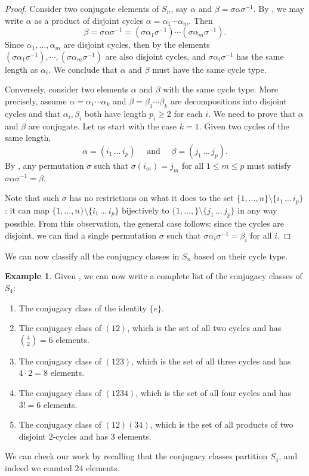 \documentclass[12pt]{report}
\numberwithin{equation}{section}
\numberwithin{theorem}{chapter}
\theoremstyle{definition}
\newtheorem{example}[theorem]{Example}
\newtheorem*{basic properties}{Basic Properties}
\newtheorem*{Important Remark}{Important Remark}
\newcommand{\s}{\sigma}
\begin{document}
\begin{proof}
Consider two conjugate elements of $S_n$, say $\alpha$ and $\beta = \s \alpha \s^{-1}$. By , we may write $\alpha$ as a product of disjoint cycles $\alpha = \alpha_1 \cdots \alpha_m$. Then 
$$\beta = \s \alpha \s^{-1} = (\s \alpha_1 \s^{-1})  \cdots (\s \alpha_m \s^{-1}).$$ 
Since $\alpha_1, \ldots, \alpha_m$ are disjoint cycles, then by  the elements $(\s \alpha_1 \s^{-1}),   \cdots, (\s \alpha_m \s^{-1})$ are also disjoint cycles, and $\s \alpha_i \s^{-1}$ has the same length as $\alpha_i$.
We conclude that $\alpha$ and $\beta$ must have the same cycle type.

Conversely, consider two elements $\alpha$ and $\beta$ with the same cycle type. More precisely, assume $\alpha = \alpha_1 \cdots \alpha_k$ and $\beta = \beta_1 \cdots \beta_k$ are decompositions into disjoint cycles and that $\alpha_i, \beta_i$ both have length $p_i \geqslant 2$ for each $i$. We need to prove that $\alpha$ and $\beta$ are conjugate. Let us start with the case $k = 1$. Given two cycles of the same length,
$$\alpha = (i_1 \, \dots \, i_p) \quad \text{ and } \quad \beta = (j_1 \, \dots \, j_p).$$
By , any permutation $\s$ such that $\s(i_m) = j_m$ for all $1 \leqslant m \leqslant p$ must satisfy $\s \alpha \s^{-1} = \beta$. 


Note that such $\s$ has no restrictions on what it does to the set $\{1, \dots, n\} \setminus \{i_1 \, \dots \, i_p\}$: it can map $\{1, \dots, n\} \setminus \{i_1 \, \dots \, i_p\}$ bijectively to $\{1, \dots, \} \setminus \{j_1 \, \dots \, j_p\}$ in any way possible. From this observation, the general case follows: since the cycles are disjoint, we can find a single permutation $\s$ such that $\s \alpha_i \s^{-1} = \beta_i$ for all $i$.
\end{proof}

We can now classify all the conjugacy classes in $S_n$ based on their cycle type.

\begin{example}
Given , we can now write a complete list of the conjugacy classes of $S_4$:
\begin{enumerate}[itemsep=-0.1em]
\item The conjugacy class of the identity $\{e\}$. 
\item The conjugacy class of $(12)$, which is the set of all two cycles and has ${4 \choose 2} = 6$ elements.
\item The conjugacy class of $(123)$, which is the set of all three cycles and has $4 \cdot 2 = 8$ elements.
\item The conjugacy class of $(1234)$, which is the set of all four cycles and has $3! = 6$ elements.
\item The conjugacy class of $(12)(34)$, which is the set of all products of two disjoint $2$-cycles and has $3$ elements.
\end{enumerate}
We can check our work by recalling that the conjugacy classes partition $S_4$, and indeed we counted $24$ elements.
\end{example}
\end{document}
